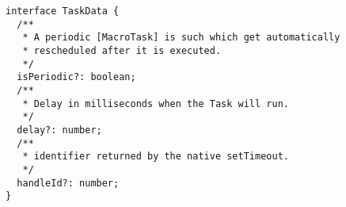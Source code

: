 \begin{verbatim}
interface TaskData {
  /**
   * A periodic [MacroTask] is such which get automatically
   * rescheduled after it is executed.
   */
  isPeriodic?: boolean;
  /**
   * Delay in milliseconds when the Task will run.
   */
  delay?: number;
  /**
   * identifier returned by the native setTimeout.
   */
  handleId?: number;
}
\end{verbatim}
